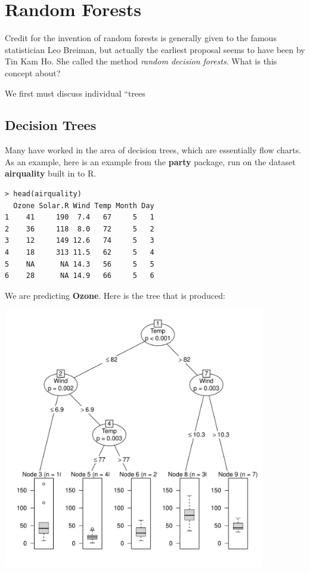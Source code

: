 \section{Random Forests}

Credit for the invention of random forests is generally given to the
famous statistician Leo Breiman, but actually the earliest proposal
seems to have been by Tin Kam Ho.  She called the method \textit{random
decision forests}.  What is this concept about?

We first must discuss individual ``trees

\subsection{Decision Trees}

Many have worked in the area of decision trees, which are essentially
flow charts.  As an example, here is an example from the \textbf{party}
package, run on the dataset \textbf{airquality} built in to R.

\begin{lstlisting}
> head(airquality)
  Ozone Solar.R Wind Temp Month Day
1    41     190  7.4   67     5   1
2    36     118  8.0   72     5   2
3    12     149 12.6   74     5   3
4    18     313 11.5   62     5   4
5    NA      NA 14.3   56     5   5
6    28      NA 14.9   66     5   6
\end{lstlisting}

We are predicting \textbf{Ozone}.  Here is the tree that is produced:

\includegraphics[width=4.5in]{AirQCTree.pdf}

